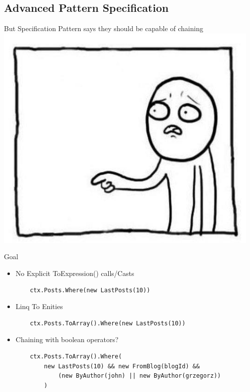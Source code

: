 \documentclass{bredelebeamer}
\begin{document}
\subsection{Advanced Pattern Specification}
\begin{frame}{But Specification Pattern says they should be capable of chaining}
    \includegraphics[scale=0.8]{images/But.png}
\end{frame}
\begin{frame}[fragile]{Goal}
    \begin{itemize}[<+->]
        \item {
            No Explicit ToExpression() calls/Casts
            \begin{lstlisting}
    ctx.Posts.Where(new LastPosts(10))
            \end{lstlisting}
        }
        \item {
            Linq To Enities
            \begin{lstlisting}
    ctx.Posts.ToArray().Where(new LastPosts(10))
            \end{lstlisting}
        }
        \item {
            Chaining with boolean operators?
            \begin{lstlisting}
    ctx.Posts.ToArray().Where(
        new LastPosts(10) && new FromBlog(blogId) &&
            (new ByAuthor(john) || new ByAuthor(grzegorz))
        )
            \end{lstlisting}
        }
    \end{itemize}

\end{frame}
\end{document}
